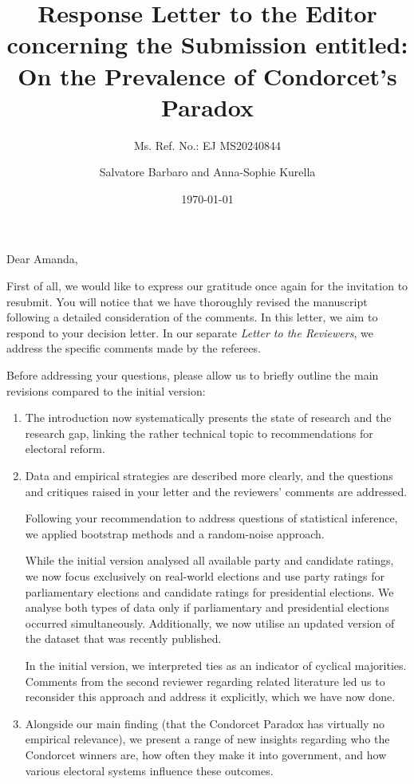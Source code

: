 \documentclass[a4paper, 12pt]{scrartcl}
\title{{\small Response Letter to the Editor concerning the Submission entitled:} \\ On the Prevalence of Condorcet's Paradox }
\subtitle{Ms. Ref. No.: EJ MS20240844}
\author{Salvatore Barbaro and Anna-Sophie Kurella}
\date{\today}
\begin{document}
\maketitle

\noindent Dear Amanda,

First of all, we would like to express our gratitude once again for the invitation to resubmit. You will notice that we have thoroughly revised the manuscript following a detailed consideration of the comments. In this letter, we aim to respond to your decision letter. In our separate \textit{Letter to the Reviewers}, we address the specific comments made by the referees.

Before addressing your questions, please allow us to briefly outline the main revisions compared to the initial version:
\begin{enumerate}
	\item The introduction now systematically presents the state of research and the research gap, linking the rather technical topic to recommendations for electoral reform.
	\item Data and empirical strategies are described more clearly, and the questions and critiques raised in your letter and the reviewers' comments are addressed.

	Following your recommendation to address questions of statistical inference, we applied bootstrap methods and a random-noise approach.
	
	While the initial version analysed all available party and candidate ratings, we now focus exclusively on real-world elections and use party ratings for parliamentary elections and candidate ratings for presidential elections. We analyse both types of data only if parliamentary and presidential elections occurred simultaneously. Additionally, we now utilise an updated version of the dataset that was recently published. 
   
	
	In the initial version, we interpreted ties as an indicator of cyclical majorities. Comments from the second reviewer regarding related literature led us to reconsider this approach and address it explicitly, which we have now done.
	\item Alongside our main finding (that the Condorcet Paradox has virtually no empirical relevance), we present a range of new insights regarding who the Condorcet winners are, how often they make it into government, and how various electoral systems influence these outcomes.
\end{enumerate}
\end{document}
